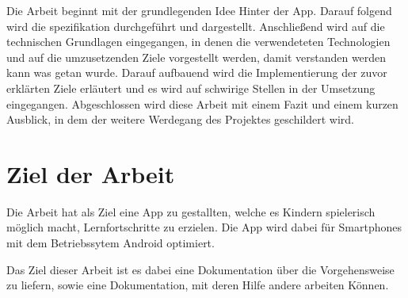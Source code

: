 Die Arbeit beginnt mit der grundlegenden Idee Hinter der App. Darauf folgend wird die spezifikation durchgeführt und dargestellt. Anschließend wird auf die technischen Grundlagen eingegangen, in denen die verwendeteten Technologien und auf die umzusetzenden Ziele vorgestellt werden, damit verstanden werden kann was getan wurde. Darauf aufbauend wird die Implementierung der zuvor erklärten Ziele erläutert und es wird auf schwirige Stellen in der Umsetzung eingegangen. Abgeschlossen wird diese Arbeit mit einem Fazit und einem kurzen Ausblick, in dem der weitere Werdegang des Projektes geschildert wird.




\section{Ziel der Arbeit}

Die Arbeit hat als Ziel eine App zu gestallten, welche es Kindern spielerisch möglich macht, Lernfortschritte zu erzielen. Die App wird dabei für Smartphones mit dem Betriebssytem Android optimiert.

Das Ziel dieser Arbeit ist es dabei eine Dokumentation über die Vorgehensweise zu liefern, sowie eine Dokumentation, mit deren Hilfe andere arbeiten Können.